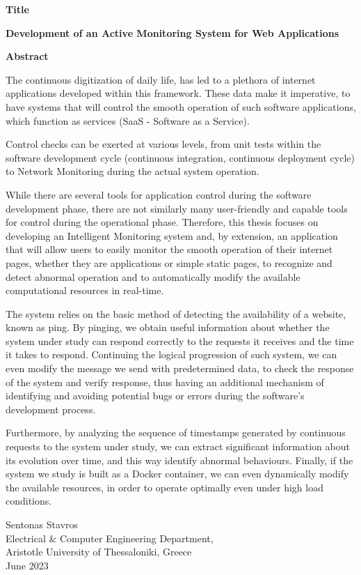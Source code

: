 {\selectfont

{}


\begin{center}
  \centering
  \textbf{\Large{Title}}
  \vspace{0.5cm}

  \textbf{\large{Development of an Active Monitoring System for Web Applications}}
  \vspace{1cm}

  \centering
  \textbf{Abstract}
\end{center}

The continuous digitization of daily life, has led to a plethora of internet applications developed within this framework. These data make it imperative, to have systems that will control the smooth operation of such software applications, which function as services (SaaS - Software as a Service).

Control checks can be exerted at various levels, from unit tests within the software development cycle (continuous integration, continuous deployment cycle) to Network Monitoring during the actual system operation.

While there are several tools for application control during the software development phase, there are not similarly many user-friendly and capable tools for control during the operational phase. Therefore, this thesis focuses on developing an Intelligent Monitoring system and, by extension, an application that will allow users to easily monitor the smooth operation of their internet pages, whether they are applications or simple static pages, to recognize and detect abnormal operation and to automatically modify the available computational resources in real-time.

The system relies on the basic method of detecting the availability of a website, known as ping. By pinging, we obtain useful information about whether the system under study can respond correctly to the requests it receives and the time it takes to respond. Continuing the logical progression of such system, we can even modify the message we send with predetermined data, to check the response of the system and verify response, thus having an additional mechanism of identifying and avoiding potential bugs or errors during the software’s development process.

Furthermore, by analyzing the sequence of timestamps generated by continuous requests to the system under study, we can extract significant information about its evolution over time, and this way identify abnormal behaviours. Finally, if the system we study is built as a Docker container, we can even dynamically modify the available resources, in order to operate optimally even under high load conditions.


\begin{flushright}
  \vspace{2cm}
  Sentonas Stavros
  \\
  Electrical \& Computer Engineering Department,
  \\
  Aristotle University of Thessaloniki, Greece
  \\
  June 2023
\end{flushright}

}
